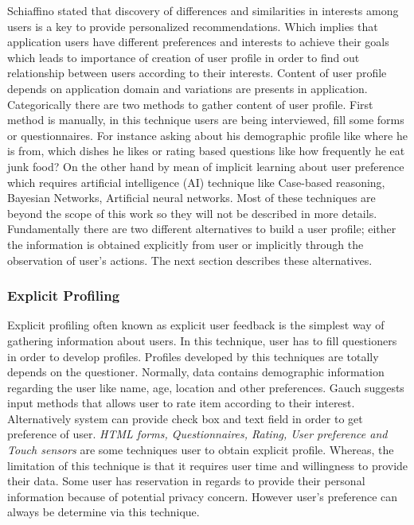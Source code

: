 Schiaffino \cite{schiaffino2009intelligent} stated that discovery of differences and similarities in interests among users is a key to provide personalized recommendations. Which implies that application users have different preferences and interests to achieve their goals which leads to importance of creation of user profile in order to find out relationship between users according to their interests. Content of user profile depends on application domain and variations are presents in application. Categorically there are two methods to gather content of user profile. First method is manually, in this technique users are being interviewed, fill some forms or questionnaires. For instance asking about his demographic profile like where he is from, which dishes he likes or rating based questions like how frequently he eat junk food? On the other hand by mean of implicit learning about user preference which requires artificial intelligence (AI) technique like Case-based reasoning, Bayesian Networks, Artificial neural networks. Most of these techniques are beyond the scope of this work so they will not be described in more details. Fundamentally there are two different alternatives to build a user profile; either the information is obtained explicitly from user or implicitly through the observation of user’s actions. The next section describes these alternatives.\newline

\subsubsection{Explicit Profiling}

Explicit profiling often known as explicit user feedback is the simplest way of gathering information about users. In this technique, user has to fill questioners in order to develop profiles. Profiles developed by this techniques are totally depends on the questioner. Normally, data contains demographic information regarding the user like name, age, location and other preferences. Gauch \cite{schiaffino2009intelligent} suggests input methods that allows user to rate item according to their interest. Alternatively system can provide check box and text field in order to get preference of user. \textit{HTML forms, Questionnaires, Rating, User preference and Touch sensors} are some techniques  user to obtain explicit profile. Whereas, the limitation of this technique is that it requires user time and willingness to provide their data.  Some user has reservation in regards to provide their personal information because of potential privacy concern. However user’s preference can always be determine via this technique.\newline

